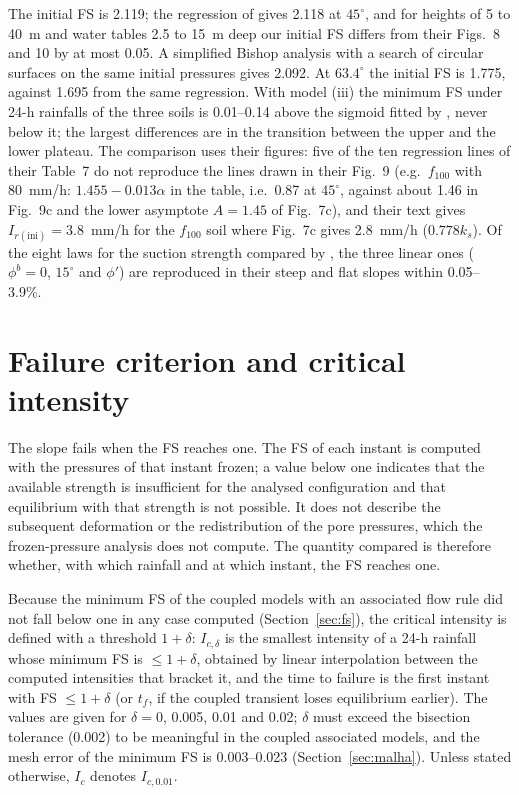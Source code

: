 \documentclass[preprint,12pt,authoryear]{elsarticle}
\newcommand{\Ic}{I_c}
\newcommand{\Icd}{I_{c,\delta}}
\begin{document}
The initial FS is 2.119; the regression of \citet[Table~7]{rahardjo2007} gives 2.118 at $45^\circ$, and for heights
of 5 to 40~m and water tables 2.5 to 15~m deep our initial FS differs from their Figs.~8 and 10 by at most 0.05. A
simplified Bishop analysis with a search of circular surfaces on the same initial pressures gives 2.092. At
$63.4^\circ$ the initial FS is 1.775, against 1.695 from the same regression. With model (iii) the minimum FS under
24-h rainfalls of the three soils is 0.01--0.14 above the sigmoid fitted by \citet[Eq.~6 and Fig.~7]{rahardjo2007},
never below it; the largest differences are in the transition between the upper and the lower plateau. The
comparison uses their figures: five of the ten regression lines of their Table~7 do not reproduce the lines drawn in
their Fig.~9 (e.g.\ $f_{100}$ with 80~mm/h: $1.455-0.013\alpha$ in the table, i.e.\ 0.87 at $45^\circ$, against about
1.46 in Fig.~9c and the lower asymptote $A=1.45$ of Fig.~7c), and their text gives $I_{r(\mathrm{ini})}=3.8$~mm/h
for the $f_{100}$ soil where Fig.~7c gives 2.8~mm/h ($0.778k_s$). Of the eight laws for the suction strength compared
by \citet[Tables~4 and 5]{zhang2014}, the three linear ones ($\phi^b=0$, $15^\circ$ and $\phi'$) are reproduced in
their steep and flat slopes within 0.05--3.9\%.

\section{Failure criterion and critical intensity}\label{sec:criterio}

The slope fails when the FS reaches one. The FS of each instant is computed with the pressures of that instant
frozen; a value below one indicates that the available strength is insufficient for the analysed configuration and
that equilibrium with that strength is not possible. It does not describe the subsequent deformation or the
redistribution of the pore pressures, which the frozen-pressure analysis does not compute. The quantity compared is
therefore whether, with which rainfall and at which instant, the FS reaches one.

Because the minimum FS of the coupled models with an associated flow rule did not fall below one in any case
computed (Section~\ref{sec:fs}), the critical intensity is defined with a threshold $1+\delta$: $\Icd$ is the smallest
intensity of a 24-h rainfall whose minimum FS is $\le1+\delta$, obtained by linear interpolation between the computed
intensities that bracket it, and the time to failure is the first instant with FS $\le1+\delta$ (or $t_f$, if the
coupled transient loses equilibrium earlier). The values are given for $\delta=0$, 0.005, 0.01 and 0.02; $\delta$ must
exceed the bisection tolerance (0.002) to be meaningful in the coupled associated models, and the mesh error of the
minimum FS is 0.003--0.023 (Section~\ref{sec:malha}). Unless stated otherwise, $\Ic$ denotes $I_{c,0.01}$.
\end{document}
